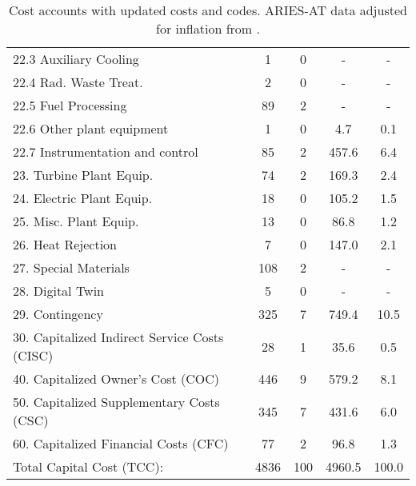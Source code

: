 \begin{table}[h!]
{\begin{tabular}{lcccc}
\hspace{10mm}22.3 Auxiliary Cooling & 1 & 0 & - & - \\
\hspace{10mm}22.4 Rad. Waste Treat. & 2 & 0 & - & - \\
\hspace{10mm}22.5 Fuel Processing & 89 & 2 & - & - \\
\hspace{10mm}22.6 Other plant equipment & 1 & 0 & 4.7 & 0.1 \\
\hspace{10mm}22.7 Instrumentation and control & 85 & 2 & 457.6 & 6.4 \\
\hspace{5mm}23. Turbine Plant Equip. & 74 & 2 & 169.3 & 2.4 \\
\hspace{5mm}24. Electric Plant Equip. & 18 & 0 & 105.2 & 1.5 \\
\hspace{5mm}25. Misc. Plant Equip. & 13 & 0 & 86.8 & 1.2 \\
\hspace{5mm}26. Heat Rejection & 7 & 0 & 147.0 & 2.1 \\
\hspace{5mm}27. Special Materials & 108 & 2 & - & - \\
\hspace{5mm}28. Digital Twin & 5 & 0 & - & - \\
\hspace{5mm}29. Contingency & 325 & 7 & 749.4 & 10.5 \\
30. Capitalized Indirect Service Costs (CISC) & 28 & 1 & 35.6 & 0.5 \\
40. Capitalized Owner’s Cost (COC) & 446 & 9 & 579.2 & 8.1 \\
50. Capitalized Supplementary Costs (CSC) & 345 & 7 & 431.6 & 6.0 \\
60. Capitalized Financial Costs (CFC) & 77 & 2 & 96.8 & 1.3 \\
\hline
Total Capital Cost (TCC): & 4836 & 100 & 4960.5 & 100.0 \\
\hline
\end{tabular}
}
\caption{Cost accounts with updated costs and codes. ARIES-AT data adjusted for inflation from \cite{gordon1986mirror}.}
\label{tab:costs_updated_codes}
\end{table}


